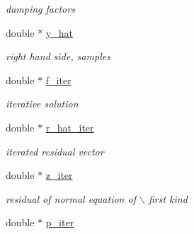 \begin{CompactItemize}
\begin{CompactList}\small\item\em damping factors \item\end{CompactList}\item 
\hypertarget{structinfst__adjoint__plan_52d2b0b0d208e673eada45dff01e9c13}{
double $\ast$ \hyperlink{structinfst__adjoint__plan_52d2b0b0d208e673eada45dff01e9c13}{y\_\-hat}}
\label{structinfst__adjoint__plan_52d2b0b0d208e673eada45dff01e9c13}

\begin{CompactList}\small\item\em right hand side, samples \item\end{CompactList}\item 
\hypertarget{structinfst__adjoint__plan_53b03057778ae78ee06efd6b135e23fb}{
double $\ast$ \hyperlink{structinfst__adjoint__plan_53b03057778ae78ee06efd6b135e23fb}{f\_\-iter}}
\label{structinfst__adjoint__plan_53b03057778ae78ee06efd6b135e23fb}

\begin{CompactList}\small\item\em iterative solution \item\end{CompactList}\item 
\hypertarget{structinfst__adjoint__plan_bd086bc019b356986e38f3db8039051f}{
double $\ast$ \hyperlink{structinfst__adjoint__plan_bd086bc019b356986e38f3db8039051f}{r\_\-hat\_\-iter}}
\label{structinfst__adjoint__plan_bd086bc019b356986e38f3db8039051f}

\begin{CompactList}\small\item\em iterated residual vector \item\end{CompactList}\item 
\hypertarget{structinfst__adjoint__plan_254d587d2d91f18fb55a2ccae89198a5}{
double $\ast$ \hyperlink{structinfst__adjoint__plan_254d587d2d91f18fb55a2ccae89198a5}{z\_\-iter}}
\label{structinfst__adjoint__plan_254d587d2d91f18fb55a2ccae89198a5}

\begin{CompactList}\small\item\em residual of normal equation of $\backslash$ first kind \item\end{CompactList}\item 
\hypertarget{structinfst__adjoint__plan_53b6ba348be2011c1cfecdb9f16829fd}{
double $\ast$ \hyperlink{structinfst__adjoint__plan_53b6ba348be2011c1cfecdb9f16829fd}{p\_\-iter}}
\label{structinfst__adjoint__plan_53b6ba348be2011c1cfecdb9f16829fd}


\end{CompactItemize}
